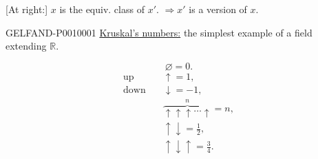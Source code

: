 [At right:] $x$ is the equiv. class of $x'$. $\Rightarrow x'$ is a version of $x$.


\begin{GelfandAdjacentEvidence}{GELFAND-P001000}{1}
\underline{Kruskal's numbers:} the simplest example of a field extending $\mathbb R$.
\end{GelfandAdjacentEvidence}

\[
\varnothing=0.
\]
\[
\begin{aligned}
\text{up}\quad&\uparrow=1,\\
\text{down}\quad&\downarrow=-1,\\
&\overbrace{\uparrow\uparrow\uparrow\ldots\uparrow}^{n}=n,\\
&\uparrow\downarrow=\frac12,\\
&\uparrow\downarrow\uparrow=\frac34.
\end{aligned}
\]

